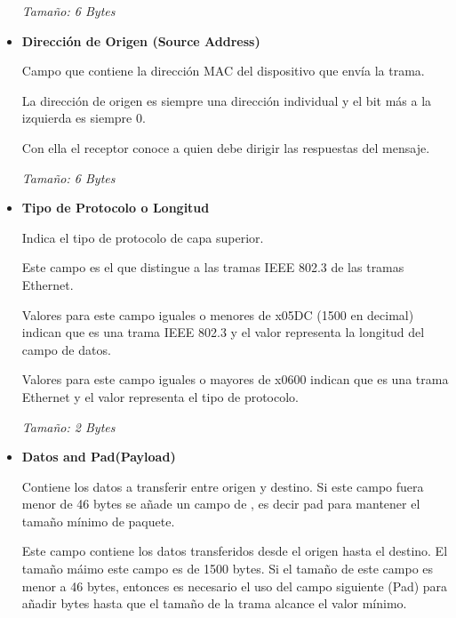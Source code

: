 \documentclass[12pt, fleqn]{report}                             %
\newcommand \Quote {\qq}                                        %
\theoremstyle{break}                                            %
\begin{document}
\begin{itemize}
                            \emph{Tamaño: 6 Bytes} 

                    \clearpage

                    \item
                        \textbf{Dirección de Origen (Source Address)}

                            Campo que contiene la dirección MAC del dispositivo que envía la trama.

                            La dirección de origen es siempre una dirección individual y el bit más a la izquierda es
                            siempre 0.

                            Con ella el receptor conoce a quien debe dirigir las respuestas del mensaje. 
                            
                            \emph{Tamaño: 6 Bytes} 

                    \item
                        \textbf{Tipo de Protocolo o Longitud}

                            Indica el tipo de protocolo de capa superior.

                            Este campo es el que distingue a las tramas IEEE 802.3 de las tramas Ethernet. 

                            Valores para este campo iguales o menores de x05DC (1500 en decimal) indican que es una trama IEEE 802.3 y
                            el valor representa la longitud del campo de datos. 

                            Valores para este campo iguales o mayores de x0600 indican que es una trama Ethernet y el valor representa
                            el tipo de protocolo. 

                            \emph{Tamaño: 2 Bytes} 

                    \item
                        \textbf{Datos and Pad(Payload)}

                        Contiene los datos a transferir entre origen y destino.
                        Si este campo fuera menor de 46 bytes se añade un campo de \Quote{relleno}, es decir pad para mantener
                        el tamaño mínimo de paquete.

                        Este campo contiene los datos transferidos desde el origen hasta el destino. El tamaño máimo este
                        campo es de 1500 bytes. Si el tamaño de este campo es menor a 46 bytes, entonces es necesario el uso del
                        campo siguiente (Pad) para añadir bytes hasta que el tamaño de la trama alcance el valor mínimo.


\end{itemize}
\end{document}
